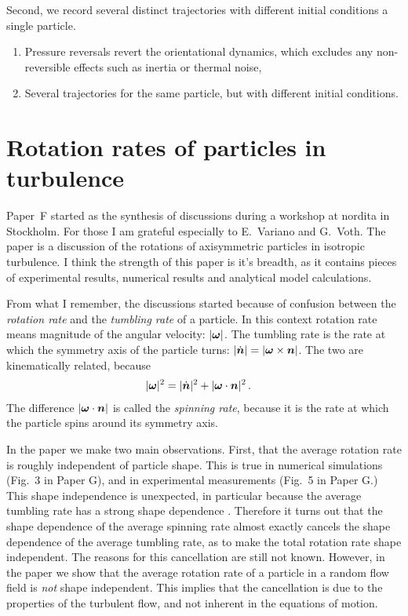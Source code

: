 \documentclass[thesis.tex]{subfiles}
\begin{document}
Second, we record several distinct trajectories with different initial conditions a single particle.
\begin{enumerate}
    \item Pressure reversals revert the orientational dynamics, which excludes any non-reversible effects such as inertia or thermal noise,
    \item Several trajectories for the same particle, but with different initial conditions.
\end{enumerate}

\chapter{Rotation rates of particles in turbulence}
Paper~F started as the synthesis of discussions during a workshop at {\sc nordita} in Stockholm. For those I am grateful especially to E.~Variano and G.~Voth. The paper is a discussion of the rotations of axisymmetric particles in isotropic turbulence. I think the strength of this paper is it's breadth, as it contains pieces of experimental results, numerical results and analytical model calculations.

From what I remember, the discussions started because of confusion between the \emph{rotation rate} and the \emph{tumbling rate} of a particle. In this context rotation rate means magnitude of the angular velocity: $|\mbox{\boldmath$\omega$}|$. The tumbling rate is the rate at which the symmetry axis of the particle turns: $|\dot{\mbox{\boldmath$n$}}|=|\mbox{\boldmath$\omega$} \times \mbox{\boldmath$n$}|$. The two are kinematically related, because
\begin{align}
    |\mbox{\boldmath$\omega$}|^2 &= |\dot{\mbox{\boldmath$n$}}|^2 + |\mbox{\boldmath$\omega$} \cdot \mbox{\boldmath$n$}|^2\,.
\end{align}
The difference $|\mbox{\boldmath$\omega$} \cdot \mbox{\boldmath$n$}|$ is called the \emph{spinning rate}, because it is the rate at which the particle spins around its symmetry axis.

In the paper we make two main observations. First, that the average rotation rate is roughly independent of particle shape. This is true in numerical simulations (Fig.~3 in Paper G), and in experimental measurements (Fig.~5 in Paper G.) This shape independence is unexpected, in particular because the average tumbling rate has a strong shape dependence \cite{parsa2012,gustavsson2014}. Therefore it turns out that the shape dependence of the average spinning rate almost exactly cancels the shape dependence of the average tumbling rate, as to make the total rotation rate shape independent. The reasons for this cancellation are still not known. However, in the paper we show that the average rotation rate of a particle in a random flow field is \emph{not} shape independent. This implies that the cancellation is due to the properties of the turbulent flow, and not inherent in the equations of motion.
\end{document}
